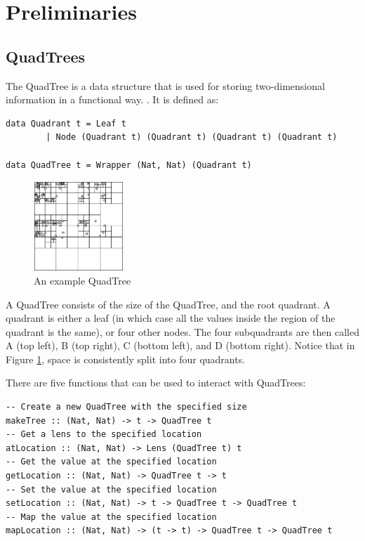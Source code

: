 \section{Preliminaries}
\subsection{QuadTrees}
The QuadTree is a data structure that is used for storing two-dimensional information in a functional way. \cite{Finkel1974}. It is defined as:
\begin{verbatim}
data Quadrant t = Leaf t
        | Node (Quadrant t) (Quadrant t) (Quadrant t) (Quadrant t)

data QuadTree t = Wrapper (Nat, Nat) (Quadrant t)
\end{verbatim}

\begin{figure} %
    \includegraphics[width=0.3\textwidth]{graphics/test.png}
    \caption{An example QuadTree}
    \label{quadtree}
\end{figure}

A QuadTree consists of the size of the QuadTree, and the root quadrant. A quadrant is either a leaf (in which case all the values inside the region of the quadrant is the same), or four other nodes. The four subquadrants are then called A (top left), B (top right), C (bottom left), and D (bottom right). Notice that in Figure \ref{quadtree}, space is consistently split into four quadrants.

There are five functions that can be used to interact with QuadTrees:
\begin{verbatim}
-- Create a new QuadTree with the specified size
makeTree :: (Nat, Nat) -> t -> QuadTree t
-- Get a lens to the specified location
atLocation :: (Nat, Nat) -> Lens (QuadTree t) t
-- Get the value at the specified location
getLocation :: (Nat, Nat) -> QuadTree t -> t
-- Set the value at the specified location
setLocation :: (Nat, Nat) -> t -> QuadTree t -> QuadTree t
-- Map the value at the specified location
mapLocation :: (Nat, Nat) -> (t -> t) -> QuadTree t -> QuadTree t
\end{verbatim}

